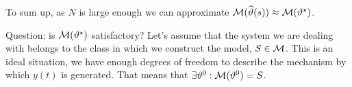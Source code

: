 To sum up, as $N$ is large enough we can approximate $\mathcal{M}(\widehat{\vartheta}(s))\approx\mathcal{M}(\vartheta ^{\star})$.

Question: is $\mathcal{M}(\vartheta^{\star})$ satisfactory? Let's assume that the system we are dealing with belongs to the class in which we construct the model, $S\in \mathcal{M}$. This is an ideal situation, we have enough degrees of freedom to describe the mechanism by which $y(t)$ is generated. That means that $\exists\vartheta^{0}: \mathcal{M}(\vartheta^{0}) = S$.